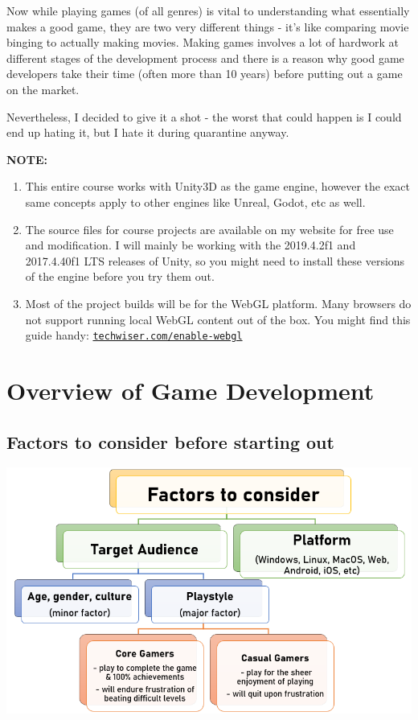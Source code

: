 \documentclass{article}[a4paper,12pt]
\theoremstyle{definition}
\begin{document}
Now while playing games (of all genres) is vital to understanding what essentially makes a good game, they are two very different things - it's like comparing movie binging to actually making movies. Making games involves a lot of hardwork at different stages of the development process and there is a reason why good game developers take their time (often more than 10 years) before putting out a game on the market.
\vspace{12pt}

Nevertheless, I decided to give it a shot - the worst that could happen is I could end up hating it, but I hate it during quarantine anyway.

\hrulefill
\vspace{6pt}

\textbf{NOTE:} 
\begin{enumerate}
	\item This entire course works with Unity3D as the game engine, however the exact same concepts apply to other engines like Unreal, Godot, etc as well.
	\item The source files for course projects are available on my website for free use and modification. I will mainly be working with the 2019.4.2f1 and 2017.4.40f1 LTS releases of Unity, so you might need to install these versions of the engine before you try them out.
	\item Most of the project builds will be for the WebGL platform. Many browsers do not support running local WebGL content out of the box. You might find this guide handy: \texttt{\href{techwiser.com/enable-webgl}{techwiser.com/enable-webgl}}
\end{enumerate}
\hrulefill
\pagebreak

\section{Overview of Game Development}
\subsection{Factors to consider before starting out}
\begin{center}\includegraphics[scale=0.8]{gamedev_basic_factors_to_consider.png}\end{center}
\end{document}
